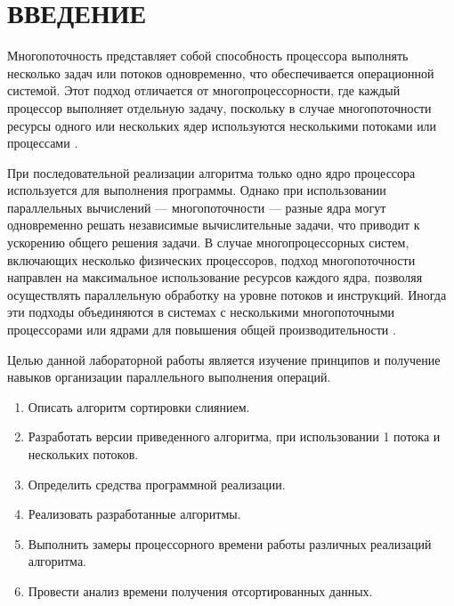 \chapter*{\hfill{\centering  ВВЕДЕНИЕ}\hfill}

Многопоточность представляет собой способность процессора выполнять несколько задач или потоков одновременно, что обеспечивается операционной системой. Этот подход отличается от многопроцессорности, где каждый процессор выполняет отдельную задачу, поскольку в случае многопоточности ресурсы одного или нескольких ядер используются несколькими потоками или процессами \cite{muti-thread}.

При последовательной реализации алгоритма только одно ядро процессора используется для выполнения программы. Однако при использовании параллельных вычислений --- многопоточности --- разные ядра могут одновременно решать независимые вычислительные задачи, что приводит к ускорению общего решения задачи.
В случае многопроцессорных систем, включающих несколько физических процессоров, подход многопоточности направлен на максимальное использование ресурсов каждого ядра, позволяя осуществлять параллельную обработку на уровне потоков и инструкций. Иногда эти подходы объединяются в системах с несколькими многопоточными процессорами или ядрами для повышения общей производительности \cite{muti-thread}.


Целью данной лабораторной работы является изучение принципов и получение навыков организации параллельного выполнения операций.

\label{sec:targets}
\begin{enumerate}
	\item Описать алгоритм сортировки слиянием.
	\item Разработать версии  приведенного алгоритма, при использовании 1 потока и нескольких потоков.
	\item Определить средства программной реализации.
	\item Реализовать разработанные алгоритмы.
	\item Выполнить замеры процессорного времени работы различных реализаций алгоритма.
	\item Провести анализ времени получения отсортированных данных.
\end{enumerate}